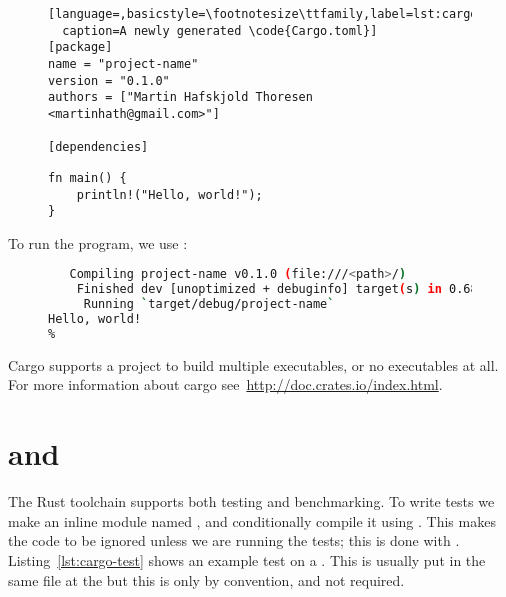 \documentclass[b5paper]{report}
\begin{document}
\begin{appendices}
  \begin{figure}[p]
  \begin{lstlisting}[language=,basicstyle=\footnotesize\ttfamily,label=lst:cargo.toml,
  caption=A newly generated \code{Cargo.toml}]
[package]
name = "project-name"
version = "0.1.0"
authors = ["Martin Hafskjold Thoresen <martinhath@gmail.com>"]

[dependencies]
  \end{lstlisting}
\end{figure}

\begin{figure}[p]
  \begin{lstlisting}[caption=Hello World in Rust,label=lst:hello-world]
fn main() {
    println!("Hello, world!");
}
  \end{lstlisting}
\end{figure}

  To run the program, we use \cargo{}:

  \begin{figure}[ht]
  \begin{lstlisting}[language=Bash,numbers=none]
% cargo run
   Compiling project-name v0.1.0 (file:///<path>/)
    Finished dev [unoptimized + debuginfo] target(s) in 0.68 secs
     Running `target/debug/project-name`
Hello, world!
%
  \end{lstlisting}
\end{figure}

  Cargo supports a project to build multiple executables, or no executables at all.
  For more information about cargo see~\url{http://doc.crates.io/index.html}.

  \section{\code{\#[test]} and \code{\#[bench]}}
  \label{sec:rust-test}
  The Rust toolchain supports both testing and benchmarking. To write tests we
  make an inline module named , and conditionally compile it using
  . This makes the code to be ignored unless we are running
  the tests; this is done with . Listing~\ref{lst:cargo-test}
  shows an example test on a . This is usually put in the same file
  at the  but this is only by convention, and not required.


\end{appendices}
\end{document}
